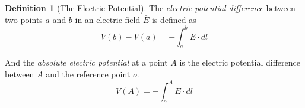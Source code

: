 \documentclass{article}
\theoremstyle{definition}
\newtheorem{definition}{Definition}[section]
\theoremstyle{plain}
\theoremstyle{remark}
\begin{document}
\begin{definition}[The Electric Potential]
    The \textit{electric potential difference} between two points $a$ and $b$ in an electric field $\bar{E}$ is defined as
    $$
        V(b) - V(a) = - \int_a^b \bar{E} \cdot d\bar{l}
    $$

    And the \textit{absolute electric potential} at a point $A$ is the electric potential difference between $A$ and the reference point $o$.
    $$
    V(A) = - \int_o^A \bar{E} \cdot d\bar{l}
    $$
\end{definition}
\end{document}
